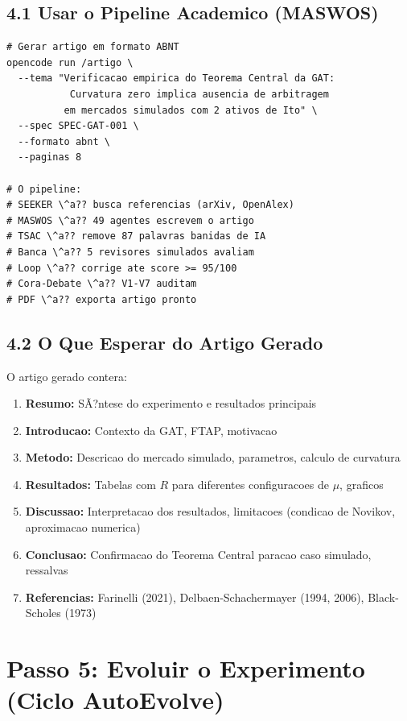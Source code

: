 \subsection{4.1 Usar o Pipeline Academico (MASWOS)}

\begin{lstlisting}[caption={Gerar artigo sobre o experimento}, label=lst:artigo]
# Gerar artigo em formato ABNT
opencode run /artigo \
  --tema "Verificacao empirica do Teorema Central da GAT:
           Curvatura zero implica ausencia de arbitragem
          em mercados simulados com 2 ativos de Ito" \
  --spec SPEC-GAT-001 \
  --formato abnt \
  --paginas 8

# O pipeline:
# SEEKER \^a?? busca referencias (arXiv, OpenAlex)
# MASWOS \^a?? 49 agentes escrevem o artigo
# TSAC \^a?? remove 87 palavras banidas de IA
# Banca \^a?? 5 revisores simulados avaliam
# Loop \^a?? corrige ate score >= 95/100
# Cora-Debate \^a?? V1-V7 auditam
# PDF \^a?? exporta artigo pronto
\end{lstlisting}

\subsection{4.2 O Que Esperar do Artigo Gerado}

O artigo gerado contera:

\begin{enumerate}[nosep]
 \item \textbf{Resumo:} S\~A?ntese do experimento e resultados principais
 \item \textbf{Introducao:} Contexto da GAT, FTAP, motivacao
 \item \textbf{Metodo:} Descricao do mercado simulado, parametros,
 calculo de curvatura
 \item \textbf{Resultados:} Tabelas com $R$ para diferentes
 configuracoes de $\mu$, graficos
 \item \textbf{Discussao:} Interpretacao dos resultados, limitacoes
 (condicao de Novikov, aproximacao numerica)
 \item \textbf{Conclusao:} Confirmacao do Teorema Central paracao caso
 simulado, ressalvas
 \item \textbf{Referencias:} Farinelli (2021), Delbaen-Schachermayer
 (1994, 2006), Black-Scholes (1973)
\end{enumerate}

\section{Passo 5: Evoluir o Experimento (Ciclo AutoEvolve)}

